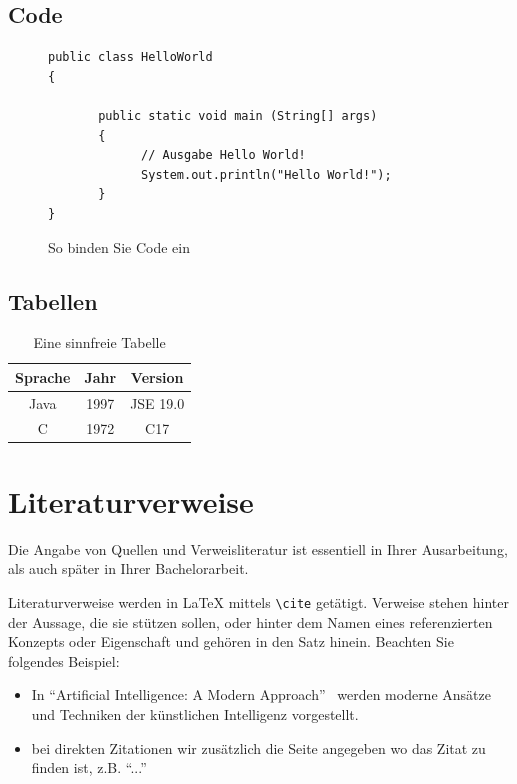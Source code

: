 \documentclass{hhuarticle}
\begin{document}
  \subsection{Code}

  \begin{figure}[h]

\begin{lstlisting}
public class HelloWorld 
{
 
       public static void main (String[] args)
       {
             // Ausgabe Hello World!
             System.out.println("Hello World!");
       }
}
\end{lstlisting}
 \caption{So binden Sie Code ein}%
  \label{fig:codeBlock}
\end{figure}

  \subsection{Tabellen}

\begin{table}[h!]
\centering
\begin{tabular}{ |c|c|c| } 
 \hline
 Sprache & Jahr & Version \\ 
\hline
 Java & 1997 & JSE 19.0 \\ 
 C & 1972 & C17 \\ 
 \hline
\end{tabular}
\caption{Eine sinnfreie Tabelle}
\label{table:1}
\end{table}

  \section{Literaturverweise}

  Die Angabe von Quellen und Verweisliteratur ist essentiell in Ihrer
  Ausarbeitung,
  als auch später in Ihrer Bachelorarbeit.

  Literaturverweise werden in \LaTeX{} mittels
  \texttt{\textbackslash cite} getätigt.
  Verweise stehen hinter der Aussage, die sie stützen sollen,
  oder hinter dem Namen eines referenzierten Konzepts oder Eigenschaft
  und gehören in den Satz hinein.
  Beachten Sie folgendes Beispiel:
  \begin{itemize}
    \item In ``Artificial Intelligence: A Modern Approach''~\cite{russell2002artificial}
      werden moderne Ansätze und Techniken
      der künstlichen Intelligenz vorgestellt.
    \item bei direkten Zitationen wir zusätzlich die Seite angegeben wo das Zitat zu finden ist, z.B. ``...''~\cite[p.1]{russell2002artificial}
  \end{itemize}
\end{document}
